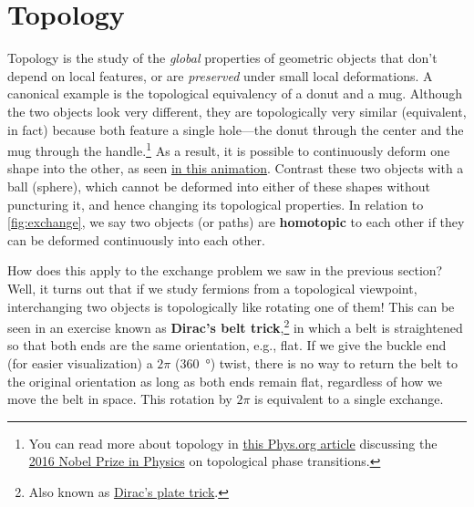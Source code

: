\documentclass[12pt, english]{book}
\begin{document}

\section{Topology}

Topology is the study of the \emph{global} properties of geometric objects that don't depend on local features, or are \emph{preserved} under small local deformations.
A canonical example is the topological equivalency of a donut and a mug.
Although the two objects look very different, they are topologically very similar (equivalent, in fact) because both feature a single hole---the donut through the center and the mug through the handle.\footnote{You can read more about topology in \href{https://phys.org/news/2016-10-coffee-donut-topology.html}{this Phys.org article} discussing the \href{https://www.nobelprize.org/prizes/physics/2016/summary/}{2016 Nobel Prize in Physics} on topological phase transitions.}
As a result, it is possible to continuously deform one shape into the other, as seen \href{https://tex.stackexchange.com/questions/210255/torus-to-coffee-mug-homotopy}{in this animation}.
Contrast these two objects with a ball (sphere), which cannot be deformed into either of these shapes without puncturing it, and hence changing its topological properties.
In relation to \autoref{fig:exchange}, we say two objects (or paths) are \textbf{homotopic} to each other if they can be deformed continuously into each other.

How does this apply to the exchange problem we saw in the previous section?
Well, it turns out that if we study fermions from a topological viewpoint, interchanging two objects is topologically like rotating one of them!
This can be seen in an exercise known as \textbf{Dirac's belt trick},\footnote{Also known as \href{https://en.wikipedia.org/wiki/Plate_trick}{Dirac's plate trick}.} in which a belt is straightened so that both ends are the same orientation, e.g., flat.
If we give the buckle end (for easier visualization) a $2\pi$ (\SI{360}{\degree}) twist, there is no way to return the belt to the original orientation as long as both ends remain flat, regardless of how we move the belt in space.
This rotation by $2\pi$ is equivalent to a single exchange.
\end{document}
